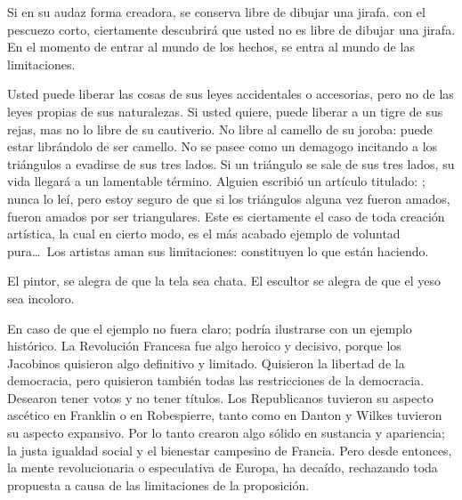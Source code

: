 Si en su audaz forma creadora, se conserva libre de dibujar una jirafa. con el pescuezo corto,
ciertamente descubrirá que usted no es libre de dibujar una jirafa. En el momento de entrar al mundo de
los hechos, se entra al mundo de las limitaciones.

Usted puede liberar las cosas de sus leyes accidentales o accesorias, pero no de las leyes propias de
sus naturalezas. Si usted quiere, puede liberar a un tigre de sus rejas, mas no lo libre de su cautiverio. No
libre al camello de su joroba: puede estar librándolo de ser camello. No se pasee como un demagogo
incitando a los triángulos a evadirse de sus tres lados. Si un triángulo se sale de sus tres lados, su vida
llegará a un lamentable término. Alguien escribió un artículo titulado: ;
nunca lo leí, pero estoy seguro de que si los triángulos alguna vez fueron amados, fueron amados por ser
triangulares. Este es ciertamente el caso de toda creación artística, la cual en cierto modo, es el más
acabado ejemplo de voluntad pura\ldots\ Los artistas aman sus limitaciones: constituyen lo que están haciendo.

El pintor, se alegra de que la tela sea chata. El escultor se alegra de que el yeso sea incoloro.

En caso de que el ejemplo no fuera claro; podría ilustrarse con un ejemplo histórico. La Revolución
Francesa fue algo heroico y decisivo, porque los Jacobinos quisieron algo definitivo y limitado. Quisieron
la libertad de la democracia, pero quisieron también todas las restricciones de la democracia. Desearon
tener votos y no tener títulos. Los Republicanos tuvieron su aspecto ascético en Franklin o en
Robespierre, tanto como en Danton y Wilkes tuvieron su aspecto expansivo. Por lo tanto crearon algo
sólido en sustancia y apariencia; la justa igualdad social y el bienestar campesino de Francia. Pero desde
entonces, la mente revolucionaria o especulativa de Europa, ha decaído, rechazando toda propuesta a
causa de las limitaciones de la proposición.


